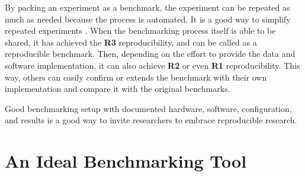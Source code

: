 By packing an experiment as a benchmark, the experiment can be repeated as much as needed because the process is automated.
It is a good way to simplify repeated experiments \citep{tichyShouldComputerScientists1998}.
When the benchmarking process itself is able to be shared, it has achieved the \textbf{R3} reproducibility, and can be called as a reproducible benchmark.
Then, depending on the effort to provide the data and software implementation, it can also achieve \textbf{R2} or even \textbf{R1} reproducibility.
This way, others can easily confirm or extends the benchmark with their own implementation and compare it with the original benchmarks.

Good benchmarking setup with documented hardware, software, configuration, and results is a good way to invite researchers to embrace reproducible research.


\section{An Ideal Benchmarking Tool}
\label{sec:idealBenchmarkingTool}



